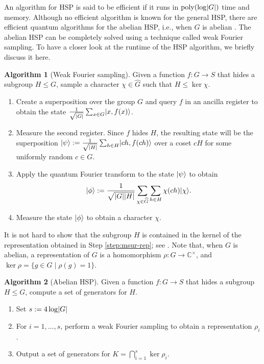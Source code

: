 \documentclass[11pt]{article}
\theoremstyle{plain}
\theoremstyle{definition}
\newtheorem{algo-thm}{Algorithm}
\DeclareMathOperator{\poly}{poly}
\DeclarePairedDelimiter{\abs}{\lvert}{\rvert}
\DeclarePairedDelimiter{\ket}{\lvert}{\rangle}
\def\C{\mathbb{C}}
\begin{document}
An algorithm for HSP is said to be efficient if it runs in $\poly(\log \abs{G})$ time and memory. 
Although no efficient algorithm is known for the general HSP, there are efficient quantum algorithms 
for the abelian HSP, i.e., when $G$ is abelian \cite{hallgren2003hidden, kaye2007introduction}. The abelian HSP can be completely solved using a 
technique called weak Fourier sampling. To have a closer look at the runtime of the HSP algorithm, 
we briefly discuss it here.

\begin{algo-thm}[Weak Fourier sampling]
	\label{alg:wfs}
	Given a function $f: G \rightarrow S$ that hides a subgroup $H \le G$, sample a	character $\chi \in \widehat{G}$ such that $H \le \ker\chi$.
	\begin{enumerate}[topsep = 0pt, itemsep = 0pt, parsep = 0pt]
		\item Create a superposition over the group $G$ and query $f$ in an ancilla register to 
		obtain the state $\frac{1}{\sqrt{\abs{G}}} \sum_{x \in G} \ket{x, f(x)}$.
		\item Measure the second register. Since $f$ hides $H$, the resulting state will be the  
		superposition $\ket{\psi} := \frac{1}{\sqrt{\abs{H}}} \sum_{h \in H} \ket{ch, f(ch)}$ 
		over a coset $cH$ for some uniformly random $c \in G$.
		\item Apply the quantum Fourier transform to the state $\ket{\psi}$ to obtain
		\[ \ket{\phi} := \frac{1}{\sqrt{\abs{G}\abs{H}}} \sum_{\chi \in \widehat{G}} \sum_{h \in H} 
		\chi(ch) \ket{\chi}. \]
		\item\label{step:msur-rep} Measure the state $\ket{\phi}$ to obtain a character $\chi$.
	\end{enumerate}
\end{algo-thm}

It is not hard to show that the subgroup $H$ is contained in the kernel of the representation 
obtained in Step \ref{step:msur-rep}; see \cite{hallgren2003hidden}. Note that, when $G$ is abelian, 
a representation of $G$ is a homomorphism $\rho: G \rightarrow \C^\times$, and $\ker \rho = \{ g \in 
G \mid \rho(g) = 1 \}$. 

\begin{algo-thm}[Abelian HSP]
	\label{alg:ahsp}
	Given a function $f: G \rightarrow S$ that hides a subgroup $H \le G$, compute a set of 
	generators for $H$.
	\begin{enumerate}[topsep = 0pt, itemsep = 0pt, parsep = 0pt]
		\item Set $s := 4\log \abs{G}$
		\item\label{step:hsp:loop} For $i = 1, \dots, s$, perform a weak Fourier sampling to obtain 
		a representation $\rho_i$.
		\item\label{step:ker} Output a set of generators for $K = \bigcap_{i = 1}^s \ker \rho_i$.
	\end{enumerate}
\end{algo-thm}
\end{document}
